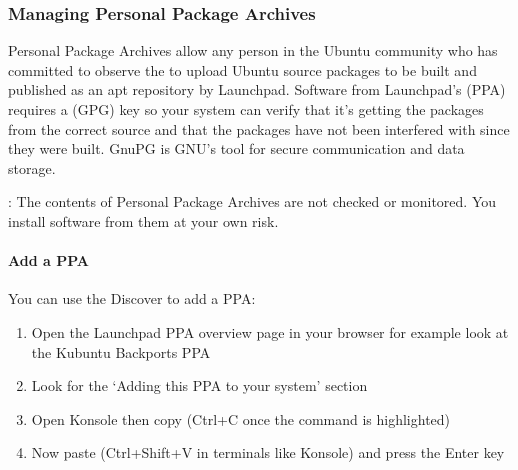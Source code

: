 \documentclass[letterpaper,10pt,english]{sphinxmanual}
\begin{document}
\sphinxAtStartPar
{}


\subsubsection{Managing Personal Package Archives}
\label{\detokenize{docs/software-management/repositories:managing-personal-package-archives}}
\sphinxAtStartPar
Personal Package Archives allow any person in the Ubuntu community who has committed to observe the  to upload Ubuntu source packages to be built and published as an apt repository by Launchpad. Software from Launchpad’s  (PPA) requires a  (GPG) key so your system can verify that it’s getting the packages from the correct source and that the packages have not been interfered with since they were built. GnuPG is GNU’s tool for secure communication and data storage.

\sphinxAtStartPar
{}: The contents of Personal Package Archives are not checked or monitored. You install software from them at your own risk.


\paragraph{Add a PPA}
\label{\detokenize{docs/software-management/repositories:add-a-ppa}}
\sphinxAtStartPar
You can use the Discover to add a PPA:
\begin{enumerate}
%
\item {} 
\sphinxAtStartPar
Open the Launchpad PPA overview page in your browser for example look at the Kubuntu Backports PPA

\item {} 
\sphinxAtStartPar
Look for the ‘Adding this PPA to your system’ section

\item {} 
\sphinxAtStartPar
Open Konsole then copy (Ctrl+C once the command is highlighted)

\item {} 
\sphinxAtStartPar
Now paste (Ctrl+Shift+V in terminals like Konsole) and press the Enter key

\end{enumerate}
\end{document}
